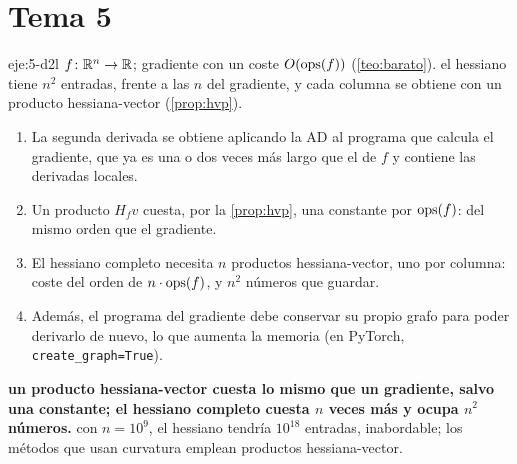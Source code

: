 \section{Tema 5}

\begin{solucion}{eje:5-d2l}
\datos $f\colon\mathbb{R}^{n}\to\mathbb{R}$; gradiente con un coste $O(\operatorname{ops}(f))$ (\cref{teo:barato}).
\planteamiento el hessiano tiene $n^{2}$ entradas, frente a las $n$ del gradiente, y cada columna se obtiene con un producto hessiana-vector (\cref{prop:hvp}).
\pasos
\begin{enumerate}[label=\arabic*.]
  \item La segunda derivada se obtiene aplicando la AD al programa que calcula el gradiente, que ya es una o dos veces más largo que el de $f$ y contiene las derivadas locales.
  \item Un producto $H_fv$ cuesta, por la \cref{prop:hvp}, una constante por $\operatorname{ops}(f)$: del mismo orden que el gradiente.
  \item El hessiano completo necesita $n$ productos hessiana-vector, uno por columna: coste del orden de $n\cdot\operatorname{ops}(f)$, y $n^{2}$ números que guardar.
  \item Además, el programa del gradiente debe conservar su propio grafo para poder derivarlo de nuevo, lo que aumenta la memoria (en PyTorch, \texttt{create\_graph=True}).
\end{enumerate}
\resultado \textbf{un producto hessiana-vector cuesta lo mismo que un gradiente, salvo una constante; el hessiano completo cuesta $n$ veces más y ocupa $n^{2}$ números.}
\comprobacion con $n=10^{9}$, el hessiano tendría $10^{18}$ entradas, inabordable; los métodos que usan curvatura emplean productos hessiana-vector.
\end{solucion}


